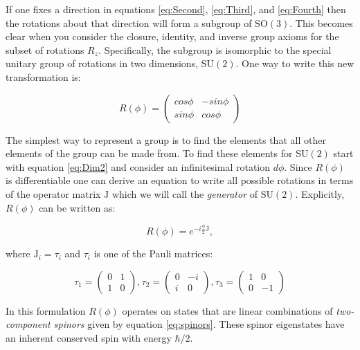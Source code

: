 If one fixes a direction in equations \ref{eq:Second}, \ref{eq:Third}, and \ref{eq:Fourth} then the rotations about that direction will form a subgroup of $\mathrm{SO}(3)$. This becomes clear when you consider the closure, identity, and inverse group axioms for the subset of rotations $R_{z}$. Specifically, the subgroup is isomorphic to the special unitary group of rotations in two dimensions, $\mathrm{SU}(2)$. One way to write this new transformation is: 

\begin{equation}
\label{eq:Dim2}
R(\phi) = \left( \begin{array}{cc}
cos\phi & -sin\phi \\
sin\phi & cos\phi \end{array} \right)
\end{equation}

The simplest way to represent a group is to find the elements that all other elements of the group can be made from. To find these elements for $\mathrm{SU}(2)$ start with equation \ref{eq:Dim2} and consider an infinitesimal rotation $d\phi$. Since $R(\phi)$ is differentiable one can derive an equation to write all possible rotations in terms of the operator matrix $\mathrm{J}$ which we will call the \textit{generator} of $\mathrm{SU}(2)$. Explicitly, $R(\phi)$ can be written as:

\begin{equation}
\label{eq:generator}
R(\phi) = e^{-i \frac{\phi}{2} \mathrm{J}},
\end{equation}

where $\mathrm{J}_{i} = \tau_{i}$ and $\tau_{i}$ is one of the Pauli matrices:

\begin{equation}
\label{eq:Pauli}
\tau_{1} = \begin{pmatrix}
    0 & 1\\
    1 & 0
  \end{pmatrix}, \tau_{2} = \begin{pmatrix}
    0 & -i\\
    i & 0
  \end{pmatrix}, \tau_{3} = \begin{pmatrix}
    1 & 0\\
    0 & -1
  \end{pmatrix}
  \end{equation}


In this formulation $R(\phi)$ operates on states that are linear combinations of \textit{two-component spinors} given by equation \ref{eq:spinors}. These spinor eigenstates have an inherent conserved spin with energy $\hbar/2$. 

